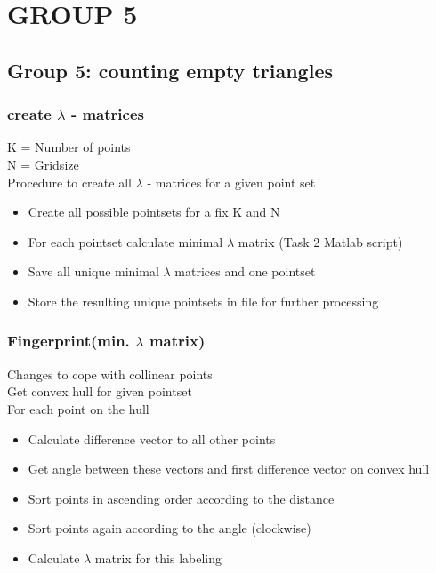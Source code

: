 
\section{GROUP 5}
\subsection{Group 5: counting empty triangles}
\begin{frame}
\frametitle{create $\lambda$ - matrices}
K = Number of points \\
N = Gridsize \\
Procedure to create all $\lambda$ - matrices for a given point set \\
\begin{itemize}
  \item Create all possible pointsets for a fix K and N
  \item For each pointset calculate minimal $\lambda$ matrix (Task 2 Matlab script)
  \item Save all unique minimal $\lambda$ matrices and one pointset
  \item Store the resulting unique pointsets in file for further processing
\end{itemize}
\end{frame}

\begin{frame}
\frametitle{Fingerprint(min. $\lambda$ matrix)}
Changes to cope with collinear points \\
Get convex hull for given pointset \\
For each point on the hull
\begin{itemize}
  \item Calculate difference vector to all other points
  \item Get angle between these vectors and first difference vector on convex hull
  \item Sort points in ascending order according to the distance
  \item Sort points again according to the angle (clockwise)
  \item Calculate $\lambda$ matrix for this labeling
\end{itemize}
\end{frame}

